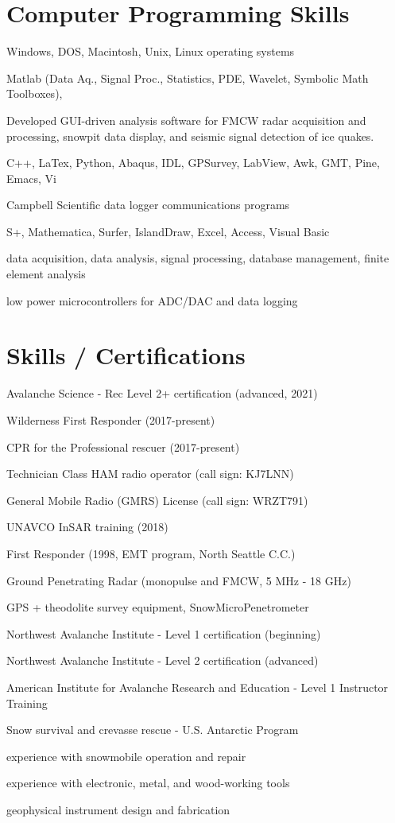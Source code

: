 \documentclass[11pt]{article}
\renewenvironment{itemize}{
  \begin{list}{}{
    \setlength{\leftmargin}{1.5em}
    \setlength{\itemsep}{0pt}
    \setlength{\parskip}{0pt}
  }
}{
  \end{list}
}
\begin{document}
\section*{Computer Programming Skills}
\begin{itemize}
\item Windows, DOS, Macintosh, Unix, Linux operating systems
\item Matlab (Data Aq., Signal Proc., Statistics, PDE, Wavelet, Symbolic Math Toolboxes),
\item Developed GUI-driven analysis software for FMCW radar acquisition and processing, snowpit data
   display, and seismic signal detection of ice quakes.
\item C++, LaTex, Python, Abaqus, IDL, GPSurvey, LabView, Awk, GMT, Pine, Emacs, Vi
\item Campbell Scientific data logger communications programs
\item S+, Mathematica, Surfer, IslandDraw, Excel, Access, Visual Basic
\item data acquisition, data analysis, signal processing, database management, finite element analysis
\item low power microcontrollers for ADC/DAC and data logging
\end{itemize}

\section*{Skills / Certifications}
\begin{itemize}
\item Avalanche Science - Rec Level 2+ certification (advanced, 2021)
\item Wilderness First Responder (2017-present)
\item CPR for the Professional rescuer (2017-present)
\item Technician Class HAM radio operator (call sign: KJ7LNN)
\item General Mobile Radio (GMRS) License (call sign: WRZT791)
\item UNAVCO InSAR training (2018)
\item First Responder (1998, EMT program, North Seattle C.C.)
\item Ground Penetrating Radar (monopulse and FMCW, 5 MHz - 18 GHz)
\item GPS + theodolite survey equipment, SnowMicroPenetrometer
\item Northwest Avalanche Institute - Level 1 certification (beginning)
\item Northwest Avalanche Institute - Level 2 certification (advanced)
\item American Institute for Avalanche Research and Education - Level 1 Instructor Training
\item Snow survival and crevasse rescue - U.S. Antarctic Program
\item experience with snowmobile operation and repair
\item experience with electronic, metal, and wood-working tools
\item geophysical instrument design and fabrication
\end{itemize}
\end{document}
